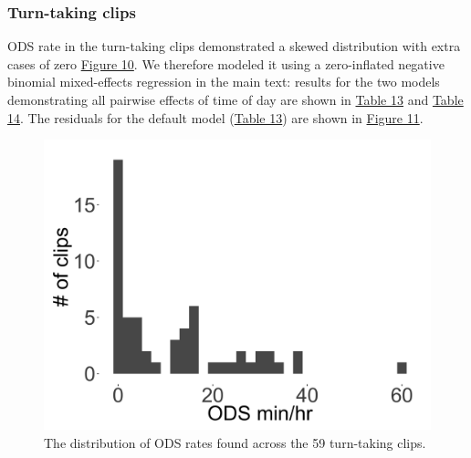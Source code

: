 \documentclass[floatsintext,man]{apa6}
\theoremstyle{definition}
\theoremstyle{definition}
\theoremstyle{definition}
\theoremstyle{remark}
\begin{document}
\FloatBarrier

\subsubsection{Turn-taking clips}\label{models-ods-turntaking}

ODS rate in the turn-taking clips demonstrated a skewed distribution
with extra cases of zero \protect\hyperlink{fig10}{Figure 10}. We
therefore modeled it using a zero-inflated negative binomial
mixed-effects regression in the main text: results for the two models
demonstrating all pairwise effects of time of day are shown in
\protect\hyperlink{tab13}{Table 13} and \protect\hyperlink{tab14}{Table
14}. The residuals for the default model
(\protect\hyperlink{tab13}{Table 13}) are shown in
\protect\hyperlink{fig11}{Figure 11}.

\FloatBarrier

\begin{figure}[H]

{\centering \includegraphics[width=0.4\linewidth]{www/ODS_turntaking_distribution} 

}

\caption{The distribution of ODS rates found across the 59 turn-taking clips.}\label{fig:fig10}
\end{figure}

\FloatBarrier
\end{document}
